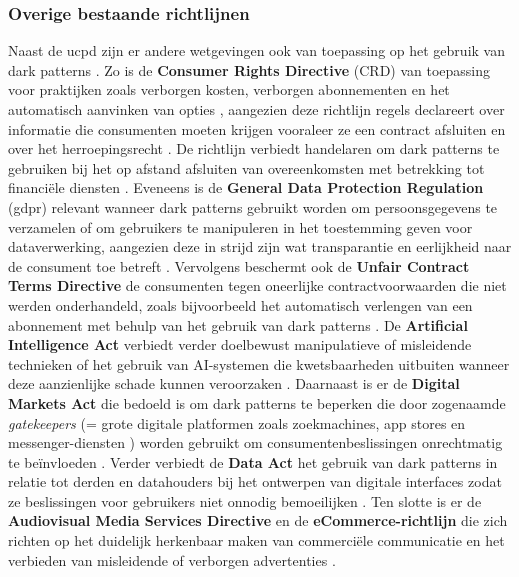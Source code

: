 \vspace{1em}

\subsubsection{Overige bestaande richtlijnen}
Naast de \acrshort{ucpd} zijn er andere wetgevingen ook van toepassing op het gebruik van dark patterns \autocite{OECD2022}. Zo is de \textbf{Consumer Rights Directive} (CRD) van toepassing voor praktijken zoals verborgen kosten, verborgen abonnementen en het automatisch aanvinken van opties \autocite{OECD2022}, aangezien deze richtlijn regels declareert over informatie die consumenten moeten krijgen vooraleer ze een contract afsluiten en over het herroepingsrecht \autocite{Commissie2022}. De richtlijn verbiedt handelaren om dark patterns te gebruiken bij het op afstand afsluiten van overeenkomsten met betrekking tot financiële diensten \autocite{EPRS2025}. Eveneens is de \textbf{General Data Protection Regulation} (\acrshort{gdpr}) relevant wanneer dark patterns gebruikt worden om persoonsgegevens te verzamelen of om gebruikers te manipuleren in het toestemming geven voor dataverwerking, aangezien deze in strijd zijn wat transparantie en eerlijkheid naar de consument toe betreft \autocite{Commissie2022}. Vervolgens beschermt ook de \textbf{Unfair Contract Terms Directive} de consumenten tegen oneerlijke contractvoorwaarden die niet werden onderhandeld, zoals bijvoorbeeld het automatisch verlengen van een abonnement met behulp van het gebruik van dark patterns \autocite{Commissie2022}. De \textbf{Artificial Intelligence Act} verbiedt verder doelbewust manipulatieve of misleidende technieken of het gebruik van AI-systemen die kwetsbaarheden uitbuiten wanneer deze aanzienlijke schade kunnen veroorzaken \autocite{EPRS2025}. Daarnaast is er de \textbf{Digital Markets Act} die bedoeld is om dark patterns te beperken die door zogenaamde \textit{gatekeepers} (= grote digitale platformen zoals zoekmachines, app stores en messenger-diensten \autocite{EU_DMA_About}) worden gebruikt om consumentenbeslissingen onrechtmatig te beïnvloeden \autocite{EPRS2025}.
Verder verbiedt de \textbf{Data Act} het gebruik van dark patterns in relatie tot derden en datahouders bij het ontwerpen van digitale interfaces zodat ze beslissingen voor gebruikers niet onnodig bemoeilijken \autocite{EPRS2025}. Ten slotte is er de \textbf{Audiovisual Media Services Directive} en de \textbf{eCommerce-richtlijn} die zich richten op het duidelijk herkenbaar maken van commerciële communicatie en het verbieden van misleidende of verborgen advertenties \autocite{Commissie2022}.

